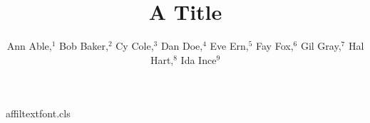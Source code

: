 \begin{filecontents*}[overwrite]{affiltextfont.cls}
\def\affilfont{\small}
\def\affil#1{\par{\reset@font\affilfont#1\par}}
\def\@maketitle{\newpage{\Large\bfseries\@title\par}\vskip1em\noindent{\bfseries\@author\par}\vskip1em}
\end{filecontents*}
\documentclass{affiltextfont}

\title{A Title}
\author{Ann Able,$^1$ Bob Baker,$^2$ Cy Cole,$^3$ Dan Doe,$^4$ Eve Ern,$^5$ Fay Fox,$^6$ Gil Gray,$^7$ Hal Hart,$^8$ Ida Ince$^9$
}
\maketitle
Body.

